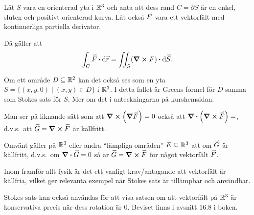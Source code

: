 \documentclass[a4paper]{article}
\begin{document}
\begin{sats}
    Låt \(
        S
    \) vara en orienterad yta i \(
        \mathbb{R}^3
    \) och anta att dess rand \(
        C = \partial S
    \) är en enkel, sluten och positivt orienterad kurva. Låt också \(
        \accentset{\rightharpoonup}{F}
    \) vara ett vektorfält med kontinuerliga partiella derivator. 
    
    Då gäller att \[
        \int_C \vef \sprod \dd \ver = \iint_S (\curl{F}) \sprod \dd \ve{S}.
    \] 
\end{sats}

Om ett område \(
    D \subseteq \mathbb{R}^2
\) kan det också ses som en yta \(
    S = \{ (x,y,0) \; | \; (x,y) \in D \}
\) i \(
    \mathbb{R}^3
\). I detta fallet är Greens formel för \(
    D
\) samma som Stokes sats för \(
    S
\). Mer om det i anteckningarna på kurshemsidan. 

\begin{anm}
    Man ser på liknande sätt som att \(
        \curl(\grad{\accentset{\rightharpoonup}{F}}) = 0
    \) också att \(
        \div(\curl{\accentset{\rightharpoonup}{F}}) = 
    \), d.v.s.\ att \(
        \accentset{\rightharpoonup}{G} = \curl{\accentset{\rightharpoonup}{F}}
    \) är källfritt.

    Omvänt gäller på \(
        \mathbb{R}^3
    \) eller andra \enquote{lämpliga områden} \(
        E \subseteq \mathbb{R}^3
    \) att om \(
        \accentset{\rightharpoonup}{G}
    \) är källfritt, d.v.s.\ om \(
        \div{\accentset{\rightharpoonup}{G}} = 0
    \) så är \(
        \accentset{\rightharpoonup}{G} = \curl{\accentset{\rightharpoonup}{F}}
    \) för något vektorfält \(
        \accentset{\rightharpoonup}{F}
    \). 
    
    Inom framför allt fysik är det ett vanligt krav/antagande att  
    vektorfält är källfria, vilket ger relevanta exempel när Stokes sats
    är tillämpbar och användbar. 
\end{anm}

\begin{anm}
    Stokes sats kan också användas för att visa satsen om att vektorfält
    på \(
        \mathbb{R}^3
    \) är konservativa precis när dess rotation är \(
        0
    \). Beviset finns i avsnitt 16.8 i boken.
\end{anm}
\end{document}

